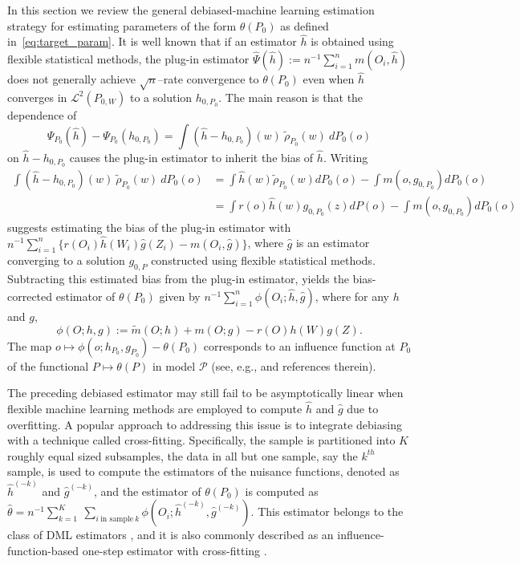 \documentclass[twoside,11pt]{article}
\newcommand{\mc}{\mathcal}
\begin{document}
In this section we review the general debiased-machine learning estimation strategy for estimating parameters of the form $\theta(P_0)$ as defined in~\eqref{eq:target_param}. 
It is well known that if an estimator $\hat{h}$ is obtained using flexible statistical methods, the plug-in estimator $\hat{\Psi}(\hat{h}) := n^{-1} \sum_{i=1}^n m(O_i, \hat{h})$ does not generally achieve $\sqrt{n}$--rate convergence to $\theta(P_0)$ even when $\hat{h}$ converges in $\mc{L}^2(P_{0,W})$ to a solution $h_{0,P_0}$. The main reason is that the dependence of
\[
\Psi_{P_0}(\hat{h}) - \Psi_{P_0}(h_{0,P_0}) = \int (\hat{h}-h_{0,P_0})(w)\:\tilde{\rho}_{P_0}(w)\: dP_0(o)
\]
on $\hat{h} - h_{0,P_0}$ causes the plug-in estimator to inherit the bias of $\hat{h}$. Writing
\begin{align*}
\int (\hat{h}-h_{0,P_0})(w)\:\tilde{\rho}_{P_0}(w)\: dP_0(o) &= \int \hat{h}(w)\tilde{\rho}_{P_0}(w) dP_0(o)-\int m(o,g_{0,P_0}) dP_0(o)
\\
&=\int r(o)\hat{h}(w)g_{0,P_0}(z) dP(o)-\int m(o,g_{0,P_0}) dP_0(o)
\end{align*}
suggests estimating the bias of the plug-in estimator with
$
n^{-1}\sum_{i=1}^n\{r(O_i)\hat{h}(W_i)\hat{g}(Z_i)-m(O_i,\hat{g})\}$,
where $\hat{g}$ is an estimator converging to a solution  $g_{0,P}$ constructed using flexible statistical methods. Subtracting this estimated bias from the plug-in estimator, yields the bias-corrected estimator of $\theta(P_0)$ given by $n^{-1}\sum_{i=1}^n \phi(O_i;\hat{h},\hat{g})$, where for any $h$ and $g$,
\begin{equation*}
    \phi(O;h,g) := \tilde{m}(O;h) + m(O;g) - r(O) h(W) g(Z).
\end{equation*}
The map $o \mapsto \phi (o;h_{P_0},g_{P_0}) - \theta(P_0)$ corresponds to an influence function at $P_0$ of the functional $P \mapsto\theta(P)$ in model $\mathcal{P}$ (see, e.g., \cite{kennedy2024semiparametric} and references therein). 

The preceding debiased estimator may still fail to be asymptotically linear when flexible machine learning methods are employed to compute $\hat{h}$ and $\hat{g}$ due to overfitting. A popular approach to addressing this issue is to integrate debiasing with a technique called cross-fitting. Specifically, the sample is partitioned into $K$ roughly equal sized subsamples, the data in all but one sample, say the $k^{th}$ sample, is used to compute the estimators of the nuisance functions, denoted as $\hat{h}^{(-k)}$ and $\hat{g}^{(-k)}$, and the estimator of $\theta(P_0)$ is computed as
$
\hat{\theta}=n^{-1}\sum_{k=1}^K\:\sum_{i\: \text{in sample}\:k}\phi(O_i;\hat{h}^{(-k)},\hat{g}^{(-k)}).$
This estimator belongs to the class of DML estimators \citep{chernozhukov2018double}, and it is also commonly described as an influence-function-based one-step estimator with cross-fitting \citep{robins2008higher}. 
\end{document}
